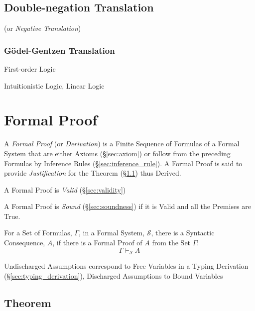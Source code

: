 \subsection{Double-negation Translation}
\label{sec:double_negation_translation}

(or \emph{Negative Translation})



\subsubsection{G\"odel-Gentzen Translation}\label{sec:godel_gentzen}

First-order Logic

Intuitionistic Logic, Linear Logic



\section{Formal Proof} \label{sec:formal_proof}

A \emph{Formal Proof} (or \emph{Derivation}) is a Finite Sequence of
Formulas of a Formal System that are either Axioms (\S\ref{sec:axiom})
or follow from the preceding Formulas by Inference Rules
(\S\ref{sec:inference_rule}). A Formal Proof is said to provide
\emph{Justification} for the Theorem (\S\ref{sec:theorem}) thus
Derived.

A Formal Proof is \emph{Valid} (\S\ref{sec:validity})

A Formal Proof is \emph{Sound} (\S\ref{sec:soundness}) if it is Valid
and all the Premises are True.

For a Set of Formulas, $\Gamma$, in a Formal System, $\mathcal{S}$,
there is a Syntactic Consequence, $A$, if there is a Formal Proof of
$A$ from the Set $\Gamma$:
\[
  \Gamma \vdash_{\mathcal{S}} A
\]

Undischarged Assumptions correspond to Free Variables in a Typing
Derivation (\S\ref{sec:typing_derivation}), Discharged Assumptions to
Bound Variables


\subsection{Theorem}\label{sec:theorem}

